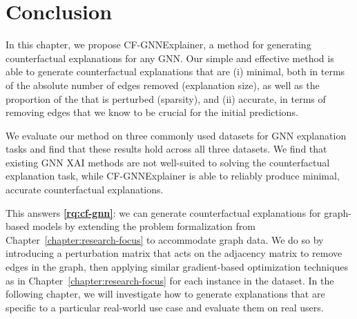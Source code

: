 










\section{Conclusion}
\label{section:cfgnn-conclusion}
In this chapter, we propose CF-GNNExplainer, a method for generating counterfactual explanations for any GNN. Our simple and effective method is able to generate counterfactual explanations that are (i) minimal, both in terms of the absolute number of edges removed (explanation size), as well as the proportion of the \cgraph{} that is perturbed (sparsity), and (ii) accurate, in terms of removing edges that we know to be crucial for the initial predictions. 

We evaluate our method on three commonly used datasets for GNN explanation tasks and find that these results hold across all three datasets. 
We find that existing GNN XAI methods are not well-suited to solving the counterfactual explanation task, while CF-GNNExplainer is able to reliably produce minimal, accurate counterfactual explanations. 

This answers \textbf{\ref{rq:cf-gnn}}: we can generate counterfactual explanations for graph-based models by extending the problem formalization from Chapter~\ref{chapter:research-focus} to accommodate graph data. 
We do so by introducing a perturbation matrix that acts on the adjacency matrix to remove edges in the graph, then applying similar gradient-based optimization techniques as in Chapter~\ref{chapter:research-focus} for each instance in the dataset. 
In the following chapter, we will investigate how to generate explanations that are specific to a particular real-world use case and evaluate them on real users. 

